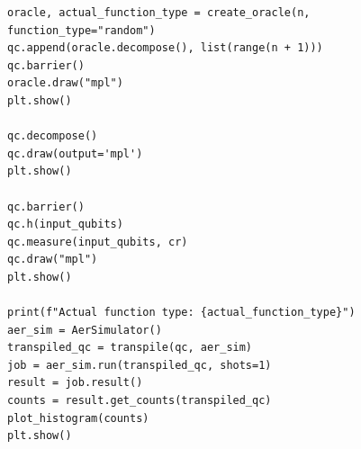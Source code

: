 \documentclass[12pt]{article}
\begin{document}
\begin{verbatim}
oracle, actual_function_type = create_oracle(n, function_type="random")
qc.append(oracle.decompose(), list(range(n + 1)))
qc.barrier()
oracle.draw("mpl")
plt.show()

qc.decompose()
qc.draw(output='mpl')
plt.show()

qc.barrier()
qc.h(input_qubits)
qc.measure(input_qubits, cr)
qc.draw("mpl")
plt.show()

print(f"Actual function type: {actual_function_type}")
aer_sim = AerSimulator()
transpiled_qc = transpile(qc, aer_sim)
job = aer_sim.run(transpiled_qc, shots=1)
result = job.result()
counts = result.get_counts(transpiled_qc)
plot_histogram(counts)
plt.show()

\end{verbatim}
\end{document}
